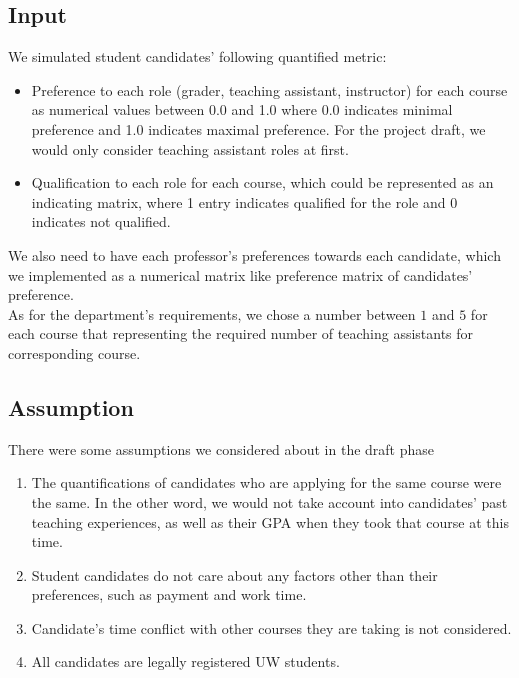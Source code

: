 \documentclass[twoside,twocolumn]{article}
\begin{document}
    \subsection{Input}
    We simulated student candidates' following quantified metric:
    \begin{itemize}
        \item Preference to each role (grader, teaching assistant, instructor) for each course as numerical values between 0.0 and 
        1.0 where 0.0 indicates minimal preference and 1.0 indicates maximal preference. For the project draft, we would only consider
        teaching assistant roles at first.
        \item Qualification to each role for each course, which could be represented as an indicating matrix, where 1 entry indicates
        qualified for the role and 0 indicates not qualified.
    \end{itemize}
    We also need to have each professor’s preferences towards each candidate, which we implemented as a numerical matrix like preference
    matrix of candidates' preference.
    \\ As for the department’s requirements, we chose a number between $1$ and $5$ for each course that representing the required number of 
    teaching assistants for corresponding course.     
    \subsection{Assumption}
    There were some assumptions we considered about in the draft phase
    \begin{enumerate}
        \item The quantifications of candidates who are applying for the same course were the same. In the other word, we would not take
        account into candidates' past teaching experiences, as well as their GPA when they took that course at this time.
        \item Student candidates do not care about any factors other than their preferences, such as payment and work time.
        \item Candidate's time conflict with other courses they are taking is not considered.
        \item All candidates are legally registered UW students.
    \end{enumerate}
\end{document}
